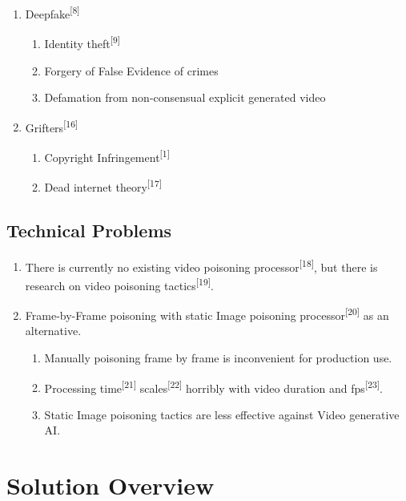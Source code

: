 \begin{enumerate}
    \item Deepfake\textsuperscript{[8]}
    \begin{enumerate}
        \item Identity theft\textsuperscript{[9]}
        \item Forgery of False Evidence of crimes
        \item Defamation from non-consensual explicit generated video
    \end{enumerate}
    
    \item Grifters\textsuperscript{[16]}
    \begin{enumerate}
        \item Copyright Infringement\textsuperscript{[1]}
        \item Dead internet theory\textsuperscript{[17]}
    \end{enumerate}
\end{enumerate}

\subsection{Technical Problems}
\label{subsection:Technical-Problems}

\begin{enumerate}
    \item There is currently no existing video poisoning processor\textsuperscript{[18]}, but there is research on video poisoning tactics\textsuperscript{[19]}.
    \item Frame-by-Frame poisoning with static Image poisoning processor\textsuperscript{[20]} as an alternative.
    \begin{enumerate}
        \item Manually poisoning frame by frame is inconvenient for production use.
        \item Processing time\textsuperscript{[21]} scales\textsuperscript{[22]} horribly with video duration and fps\textsuperscript{[23]}.
        \item Static Image poisoning tactics are less effective against Video generative AI.
    \end{enumerate}
\end{enumerate}


\section{Solution Overview}
\label{section:solution-overview}

